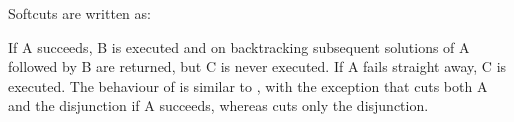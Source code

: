 Softcuts are written as:
\begin{quote}
%
\end{quote}
If A succeeds, B is executed and on backtracking subsequent
solutions of A followed by B are returned, but C is never executed.
If A fails straight away, C is executed.
The behaviour of
is similar to
,
with the exception that 
cuts both A and the disjunction if A succeeds, whereas
cuts only the disjunction.


